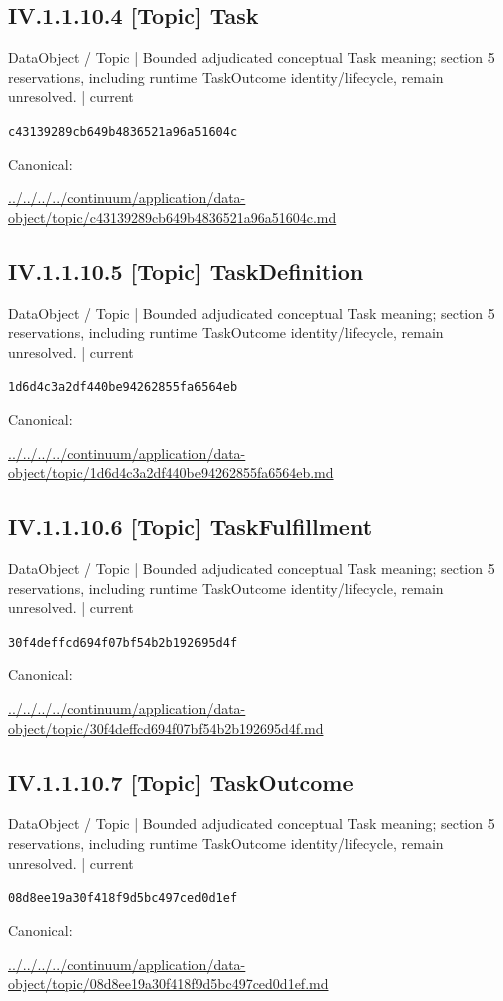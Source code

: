 \documentclass[10pt,a4paper]{article}
\begin{document}
\subsection*{IV.1.1.10.4 [Topic] Task}
\label{element-c43139289cb649b4836521a96a51604c}
{\small DataObject / Topic | Bounded adjudicated conceptual Task meaning; section 5 reservations, including runtime TaskOutcome identity/lifecycle, remain unresolved. | current}\par
\texttt{c43139289cb649b4836521a96a51604c}\par
Canonical: \par
{\footnotesize\url{../../../../continuum/application/data-object/topic/c43139289cb649b4836521a96a51604c.md}}\par
\subsection*{IV.1.1.10.5 [Topic] TaskDefinition}
\label{element-1d6d4c3a2df440be94262855fa6564eb}
{\small DataObject / Topic | Bounded adjudicated conceptual Task meaning; section 5 reservations, including runtime TaskOutcome identity/lifecycle, remain unresolved. | current}\par
\texttt{1d6d4c3a2df440be94262855fa6564eb}\par
Canonical: \par
{\footnotesize\url{../../../../continuum/application/data-object/topic/1d6d4c3a2df440be94262855fa6564eb.md}}\par
\subsection*{IV.1.1.10.6 [Topic] TaskFulfillment}
\label{element-30f4deffcd694f07bf54b2b192695d4f}
{\small DataObject / Topic | Bounded adjudicated conceptual Task meaning; section 5 reservations, including runtime TaskOutcome identity/lifecycle, remain unresolved. | current}\par
\texttt{30f4deffcd694f07bf54b2b192695d4f}\par
Canonical: \par
{\footnotesize\url{../../../../continuum/application/data-object/topic/30f4deffcd694f07bf54b2b192695d4f.md}}\par
\subsection*{IV.1.1.10.7 [Topic] TaskOutcome}
\label{element-08d8ee19a30f418f9d5bc497ced0d1ef}
{\small DataObject / Topic | Bounded adjudicated conceptual Task meaning; section 5 reservations, including runtime TaskOutcome identity/lifecycle, remain unresolved. | current}\par
\texttt{08d8ee19a30f418f9d5bc497ced0d1ef}\par
Canonical: \par
{\footnotesize\url{../../../../continuum/application/data-object/topic/08d8ee19a30f418f9d5bc497ced0d1ef.md}}\par
\end{document}

